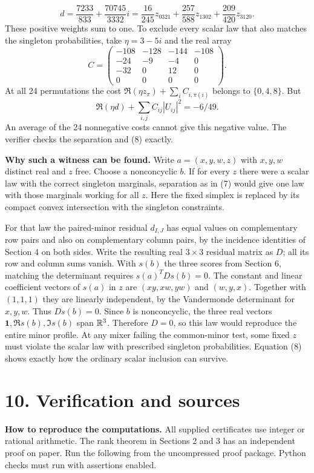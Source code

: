 \documentclass[11pt]{article}
\newcommand{\heading}[1]{\section*{\color{ink}#1}}
\begin{document}
\[
 d=\frac{7233}{833}+\frac{70745}{3332}i
   =\frac{16}{245}z_{0321}+\frac{257}{588}z_{1302}+\frac{209}{420}z_{3120}. \tag{8}
\]
These positive weights sum to one. To exclude every scalar law that also matches the singleton probabilities, take $\eta=3-5i$ and the real array
\[
 C=\begin{pmatrix}-108&-128&-144&-108\\-24&-9&-4&0\\-32&0&12&0\\0&0&0&0\end{pmatrix}.
\]
At all 24 permutations the cost $\Re(\eta z_\pi)+\sum_i C_{i,\pi(i)}$ belongs to $\{0,4,8\}$. But
\[
 \Re(\eta d)+\sum_{i,j}C_{ij}|U_{ij}|^2=-6/49.
\]
An average of the 24 nonnegative costs cannot give this negative value. The verifier checks the separation and (8) exactly.
\par\textbf{Why such a witness can be found.} Write $a=(x,y,w,z)$ with $x,y,w$ distinct real and $z$ free. Choose a nonconcyclic $b$. If for every $z$ there were a scalar law with the correct singleton marginals, separation as in (7) would give one law with those marginals working for all $z$. Here the fixed simplex is replaced by its compact convex intersection with the singleton constraints.
\par For that law the paired-minor residual $d_{I,J}$ has equal values on complementary row pairs and also on complementary column pairs, by the incidence identities of Section 4 on both sides. Write the resulting real $3\times3$ residual matrix as $D$; all its row and column sums vanish. With $s(b)$ the three scores from Section 6, matching the determinant requires $s(a)^TDs(b)=0$. The constant and linear coefficient vectors of $s(a)$ in $z$ are $(xy,xw,yw)$ and $(w,y,x)$. Together with $(1,1,1)$ they are linearly independent, by the Vandermonde determinant for $x,y,w$. Thus $Ds(b)=0$. Since $b$ is nonconcyclic, the three real vectors $\mathbf1,\Re s(b),\Im s(b)$ span $\mathbb R^3$. Therefore $D=0$, so this law would reproduce the entire minor profile. At any mixer failing the common-minor test, some fixed $z$ must violate the scalar law with prescribed singleton probabilities. Equation (8) shows exactly how the ordinary scalar inclusion can survive.
\newpage
\heading{10. Verification and sources}
\textbf{How to reproduce the computations.} All supplied certificates use integer or rational arithmetic. The rank theorem in Sections 2 and 3 has an independent proof on paper. Run the following from the uncompressed proof package. Python checks must run with assertions enabled.
\end{document}
